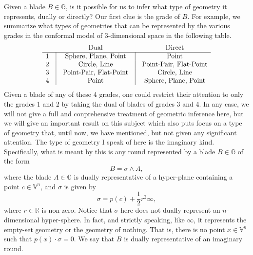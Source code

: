 \documentclass[12pt]{article}
\newcommand{\G}{\mathbb{G}}
\newcommand{\V}{\mathbb{V}}
\newcommand{\R}{\mathbb{R}}
\newcommand{\nvai}{\infty}
\begin{document}
Given a blade $B\in\G$, is it possible for us to infer what type of geometry it
represents, dually or directly?  Our first clue is the grade of $B$.
For example, we summarize what types of geometries that can be represented by the various
grades in the conformal model of 3-dimensional space in the following table.
\begin{equation*}
\begin{array}{ccccc}
 &  & \mbox{Dual} & & \mbox{Direct} \\
\hline
1 & \vline & \mbox{Sphere, Plane, Point} & \vline & \mbox{Point} \\
2 & \vline & \mbox{Circle, Line} & \vline & \mbox{Point-Pair, Flat-Point} \\
3 & \vline & \mbox{Point-Pair, Flat-Point} & \vline & \mbox{Circle, Line} \\
4 & \vline & \mbox{Point} & \vline & \mbox{Sphere, Plane, Point}
\end{array}
\end{equation*}
Given a blade of any of these 4 grades, one could restrict their attention to
only the grades 1 and 2 by taking the dual of blades of grades 3 and 4.
In any case, we will not give a full and conprehensive treatment of
geometric inference here, but we will give an important result on this subject
which also puts focus on a type of geometry that, until now, we have
mentioned, but not given any significant attention.  
The type of geometry I speak of here is the imaginary kind.
Specifically, what is meant by this is any round represented by
a blade $B\in\G$ of the form
\begin{equation*}
B = \sigma\wedge A,
\end{equation*}
where the blade $A\in\G$ is dually representative of a hyper-plane containing
a point $c\in\V^n$, and $\sigma$ is given by
\begin{equation*}
\sigma = p(c) + \frac{1}{2}r^2\nvai,
\end{equation*}
where $r\in\R$ is non-zero.  Notice that $\sigma$ here does not dually
represent an $n$-dimensional hyper-sphere.  In fact, and strictly speaking,
like $\nvai$, it represents the empty-set geometry or the geometry of nothing.
That is, there is no point $x\in\V^n$ such that $p(x)\cdot\sigma = 0$.  We say
that $B$ is dually representative of an imaginary round.
\end{document}
